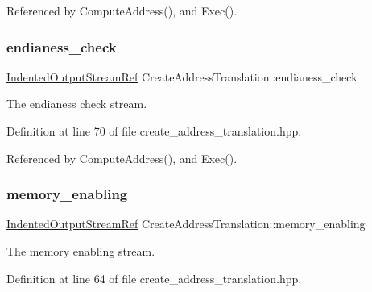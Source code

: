 Referenced by Compute\+Address(), and Exec().

\mbox{\label{classCreateAddressTranslation_a3db34cf61e2a35eb04651f67185f54a6}} 
\subsubsection{\texorpdfstring{endianess\+\_\+check}{endianess\_check}}
{\footnotesize\ttfamily \hyperlink{indented__output__stream_8hpp_ab32278e11151ef292759c88e99b77feb}{Indented\+Output\+Stream\+Ref} Create\+Address\+Translation\+::endianess\+\_\+check\hspace{0.3cm}{\ttfamily [protected]}}



The endianess check stream. 



Definition at line 70 of file create\+\_\+address\+\_\+translation.\+hpp.



Referenced by Compute\+Address(), and Exec().

\mbox{\label{classCreateAddressTranslation_a43fc1a6d78daf7adff355bee133ce150}} 
\subsubsection{\texorpdfstring{memory\+\_\+enabling}{memory\_enabling}}
{\footnotesize\ttfamily \hyperlink{indented__output__stream_8hpp_ab32278e11151ef292759c88e99b77feb}{Indented\+Output\+Stream\+Ref} Create\+Address\+Translation\+::memory\+\_\+enabling\hspace{0.3cm}{\ttfamily [protected]}}



The memory enabling stream. 



Definition at line 64 of file create\+\_\+address\+\_\+translation.\+hpp.



